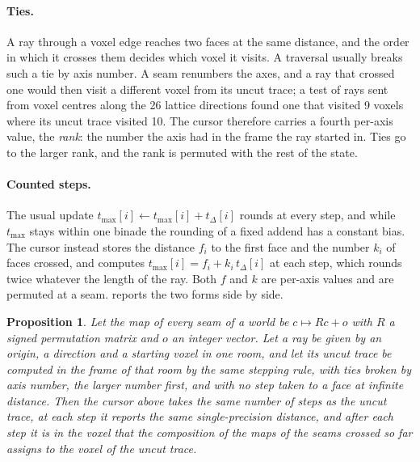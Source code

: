 \documentclass[10pt,a4paper]{article}
\newtheorem{proposition}{Proposition}
\newcommand{\tmax}{t_{\max}}
\newcommand{\tdelta}{t_{\Delta}}
\begin{document}
\paragraph{Ties.} A ray through a voxel edge reaches two faces at the same distance, and the
order in which it crosses them decides which voxel it visits. A traversal usually breaks such a
tie by axis number. A seam renumbers the axes, and a ray that crossed one would then visit a
different voxel from its uncut trace; a test of rays sent from voxel centres along the 26 lattice
directions found one that visited 9 voxels where its uncut trace visited 10. The cursor
therefore carries a fourth per-axis value, the \emph{rank}: the number the axis had in the frame
the ray started in. Ties go to the larger rank, and the rank is permuted with the rest of the
state.

\paragraph{Counted steps.} The usual update $\tmax[i] \leftarrow \tmax[i] + \tdelta[i]$ rounds at
every step, and while $\tmax$ stays within one binade the rounding of a fixed addend has a constant
bias. The cursor instead stores the distance $f_i$ to the first face and the number $k_i$ of faces
crossed, and computes $\tmax[i] = f_i + k_i\,\tdelta[i]$ at each step, which rounds twice whatever the
length of the ray. Both $f$ and $k$ are per-axis values and are permuted at a seam.
 reports the two forms side by side.

\begin{proposition}
\label{prop:agreement}
Let the map of every seam of a world be $c \mapsto Rc + o$ with $R$ a signed permutation matrix
and $o$ an integer vector. Let a ray be given by an origin, a direction and a starting voxel in
one room, and let its uncut trace be computed in the frame of that room by the same stepping
rule, with ties broken by axis number, the larger number first, and with no step taken to a face
at infinite distance. Then the cursor above takes the same number of steps as the uncut trace, at each step it
reports the same single-precision distance, and after each step it is in the voxel that the
composition of the maps of the seams crossed so far assigns to the voxel of the uncut trace.
\end{proposition}
\end{document}
